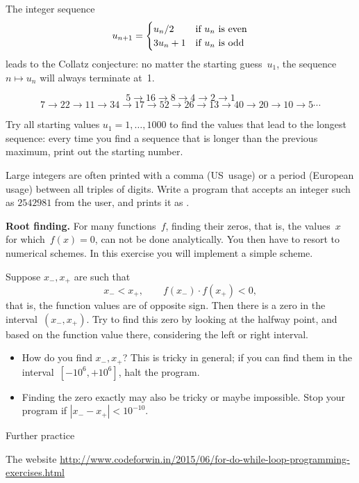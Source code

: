 \begin{exercise}
  \label{ex:collatz}
  The integer sequence
  \[ u_{n+1} = 
  \begin{cases}
    u_n/2&\hbox{if $u_n$ is even}\\
    3u_n+1&\hbox{if $u_n$ is odd}\\
  \end{cases}
  \]
  leads to the Collatz conjecture: no matter the starting guess~$u_1$,
  the sequence $n\mapsto u_n$ will always terminate at~1.

  { \small
  \[ 5\rightarrow 16\rightarrow 8\rightarrow 4\rightarrow 2\rightarrow 1\]
  \[ 7\rightarrow 22\rightarrow 11\rightarrow 34\rightarrow
  17\rightarrow 52\rightarrow 26\rightarrow 13\rightarrow
  40\rightarrow 20\rightarrow 10\rightarrow 5\cdots \]
  }

  Try all starting values $u_1=1,\ldots,1000$ to find the values that
  lead to the longest sequence: every time you find a sequence that is
  longer than the previous maximum, print out the starting number.
\end{exercise}

\begin{exercise}
  Large integers are often printed with a comma (US~usage) or a period
  (European usage) between all triples of digits. Write a program that
  accepts an integer such as $2542981$ from the user, and prints it as
  .
\end{exercise}

\begin{exercise}
  \label{ex:rootfind}
  \textbf{Root finding.}
  For many functions~$f$, finding their zeros, that is, the values~$x$
  for which~$f(x)=0$, can not be done analytically. You then have to
  resort to numerical  schemes. In this
  exercise you will implement a simple scheme.

  Suppose $x_-,x_+$ are such that 
  \[ x_-<x_+,\qquad f(x_-)\cdot f(x_+)<0,\]
  that is, the function values are of opposite sign. Then
  there is a zero in the interval~$(x_-,x_+)$. Try to find this zero
  by looking at the halfway point, and based on the function value
  there, considering the left or right interval.
  \begin{itemize}
  \item How do you find $x_-,x_+$? This is tricky in general; if you
    can find them in the interval~$[-10^6,+10^6]$, halt the program.
  \item Finding the zero exactly may also be tricky or maybe
    impossible. Stop your program if $|x_--x_+|<10^{-10}$.
  \end{itemize}
\end{exercise}

 {Further practice}

The website
\url{http://www.codeforwin.in/2015/06/for-do-while-loop-programming-exercises.html}
